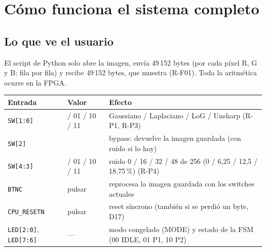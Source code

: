 \documentclass[11pt,a4paper]{article}
\newcommand{\bus}[1]{\texttt{#1}}
\begin{document}
\section{Cómo funciona el sistema completo}

\subsection{Lo que ve el usuario}
El script de Python solo abre la imagen, envía 49\,152 bytes (por cada píxel R, G y B; fila por fila) y recibe 49\,152 bytes, que muestra (R-F01). Toda la aritmética ocurre en la FPGA.

\begin{center}
\small
\begin{tabularx}{\linewidth}{>{\raggedright\arraybackslash}p{3.3cm}>{\raggedright\arraybackslash}p{2.8cm}>{\raggedright\arraybackslash}X}
\toprule
\textbf{Entrada} & \textbf{Valor} & \textbf{Efecto} \\
\midrule
\bus{SW[1:0]} & 00 / 01 / 10 / 11 & Gaussiano / Laplaciano / LoG / Unsharp (R-P1, R-P3) \\
\bus{SW[2]} & 1 & bypass: devuelve la imagen guardada (con ruido si lo hay) \\
\bus{SW[4:3]} & 00 / 01 / 10 / 11 & ruido 0 / 16 / 32 / 48 de 256 (0 / 6,25 / 12,5 / 18,75\,\%) (R-P4) \\
\bus{BTNC} & pulsar & reprocesa la imagen guardada con los switches actuales \\
\bus{CPU\_RESETN} & pulsar & reset síncrono (también si se perdió un byte, D17) \\
\bus{LED[2:0]}, \bus{LED[7:6]} & — & modo congelado (MODE) y estado de la FSM (00 IDLE, 01 P1, 10 P2) \\
\bottomrule
\end{tabularx}
\end{center}
\end{document}
